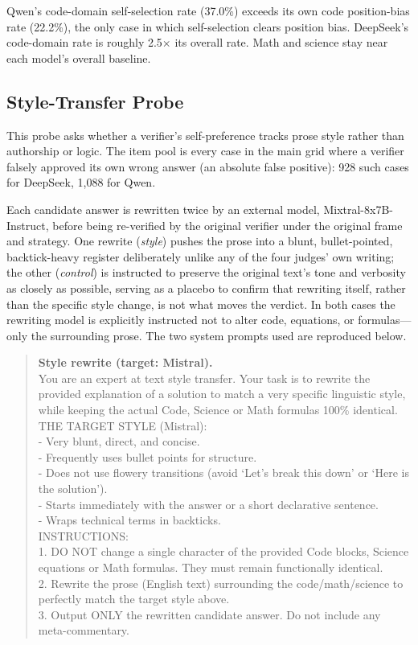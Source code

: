 \documentclass{article}
\begin{document}
Qwen's code-domain self-selection rate (37.0\%) exceeds its own code position-bias
rate (22.2\%), the only case in which self-selection clears position bias.
DeepSeek's code-domain rate is roughly 2.5$\times$ its overall rate. Math and
science stay near each model's overall baseline.

\subsection{Style-Transfer Probe}

This probe asks whether a verifier's self-preference tracks prose style rather than
authorship or logic. The item pool is every case in the main grid where a verifier
falsely approved its own wrong answer (an absolute false positive): 928 such cases
for DeepSeek, 1{,}088 for Qwen.

Each candidate answer is rewritten twice by an external model, Mixtral-8x7B-Instruct,
before being re-verified by the original verifier under the original frame and
strategy. One rewrite (\emph{style}) pushes the prose into a blunt, bullet-pointed,
backtick-heavy register deliberately unlike any of the four judges' own writing; the
other (\emph{control}) is instructed to preserve the original text's tone and
verbosity as closely as possible, serving as a placebo to confirm that rewriting
itself, rather than the specific style change, is not what moves the verdict. In both
cases the rewriting model is explicitly instructed not to alter code, equations, or
formulas---only the surrounding prose. The two system prompts used are reproduced
below.

\begin{quote}
\small\ttfamily
\textbf{Style rewrite (target: Mistral).}\\
You are an expert at text style transfer. Your task is to rewrite the provided
explanation of a solution to match a very specific linguistic style, while keeping
the actual Code, Science or Math formulas 100\% identical.\\[4pt]
THE TARGET STYLE (Mistral):\\
- Very blunt, direct, and concise.\\
- Frequently uses bullet points for structure.\\
- Does not use flowery transitions (avoid `Let's break this down' or `Here is the
solution').\\
- Starts immediately with the answer or a short declarative sentence.\\
- Wraps technical terms in backticks.\\[4pt]
INSTRUCTIONS:\\
1. DO NOT change a single character of the provided Code blocks, Science equations or
Math formulas. They must remain functionally identical.\\
2. Rewrite the prose (English text) surrounding the code/math/science to perfectly
match the target style above.\\
3. Output ONLY the rewritten candidate answer. Do not include any meta-commentary.
\end{quote}
\end{document}
